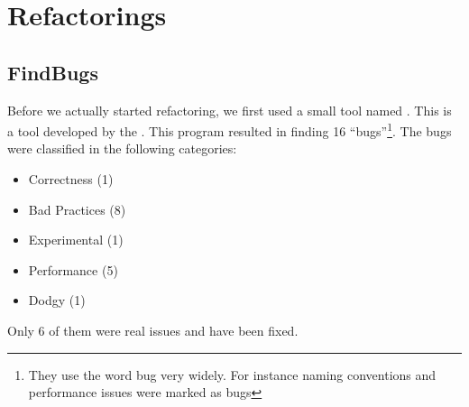 \section{Refactorings}
\subsection{FindBugs}
Before we actually started refactoring, we first used a small tool named . This is a tool developed by the . This program resulted in finding 16 ``bugs''\footnote{They use the word bug very widely. For instance naming conventions and performance issues were marked as bugs}. The bugs were classified in the following categories:
\begin{itemize}
 \item Correctness (1)
 \item Bad Practices (8)
 \item Experimental (1)
 \item Performance (5)
 \item Dodgy (1)
\end{itemize}
Only 6 of them were real issues and have been fixed.
